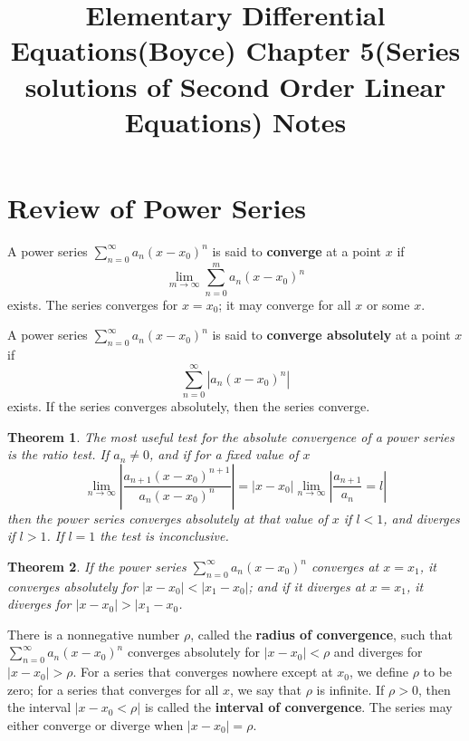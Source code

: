 \documentclass[letter]{article}
\title{Elementary Differential Equations(Boyce) Chapter 5(Series solutions of Second Order Linear Equations) Notes}
\date{}
\newtheorem{theorem}{Theorem}[section]
\newenvironment{definition}[1][Definition]{\begin{trivlist}
\item[\hskip \labelsep {\bfseries #1}]}{\end{trivlist}}
\begin{document}
\maketitle
\vspace{-.5in}

\section{Review of Power Series}
\begin{definition}
A power series $\sum_{n=0}^{\infty} a_n(x-x_0)^n$ is said to \textbf{converge} at a point $x$ if
\[
\lim_{m\to \infty} \sum_{n=0}^{m} a_n(x-x_0)^n
\]
exists. The series converges for $x=x_0$; it may converge for all $x$ or some $x$.
\end{definition}

\begin{definition}
A power series $\sum_{n=0}^{\infty} a_n(x-x_0)^n$ is said to \textbf{converge absolutely} at a point $x$ if
\[
\sum_{n=0}^{\infty} |a_n(x-x_0)^n|
\]
exists. If the series converges absolutely, then the series converge.
\end{definition}

\begin{theorem}
The most useful test for the absolute convergence of a power series is the ratio test. If $a_n\neq 0$, and if for a fixed value of $x$
\[
\lim_{n\to \infty} |\frac{a_{n+1}(x-x_0)^{n+1}}{a_n(x-x_0)^n}| = |x-x_0| \lim_{n\to \infty} |\frac{a_{n+1}}{a_n} = l|
\]
then the power series converges absolutely at that value of $x$ if $l < 1$, and diverges if $l>1$. If $l=1$ the test is inconclusive.
\end{theorem}

\begin{theorem}
If the power series  $\sum_{n=0}^{\infty} a_n(x-x_0)^n$ converges at $x = x_1$, it converges absolutely for $|x-x_0| < |x_1 - x_0|$; and if it diverges at $x=x_1$, it diverges for $|x-x_0| > |x_1-x_0$.
\end{theorem}

\begin{definition}
There is a nonnegative number $\rho$, called the \textbf{radius of convergence}, such that  $\sum_{n=0}^{\infty} a_n(x-x_0)^n$ converges absolutely for $|x-x_0|<\rho$ and diverges for $|x-x_0|>\rho$. For a series that converges nowhere except at $x_0$, we define $\rho$ to be zero; for a series that converges for all $x$, we say that $\rho$ is infinite. If $\rho>0$, then the interval $|x-x_0<\rho|$ is called the \textbf{interval of convergence}. The series may either converge or diverge when $|x-x_0| = \rho$.
\end{definition}
\end{document}

